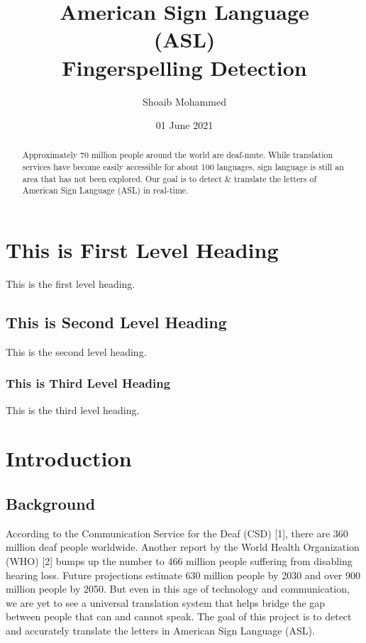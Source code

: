 \documentclass[twocolumn]{article}
\title{American Sign Language\\
	(ASL)\\
	Fingerspelling Detection}
\author{Shoaib Mohammed}
\date{01 June 2021}
\begin{document}
\begin{titlepage}
\maketitle
\thispagestyle{empty}
\end{titlepage}

\begin{abstract}
	Approximately 70 million people around the world are deaf-mute. While 
	translation services have become easily accessible for about 100 
	languages, sign language is still an area that has not been explored. 
	Our goal is to detect \& translate the letters of American Sign Language 
	(ASL) in real-time.
\end{abstract}

\section{This is First Level Heading}
This is the first level heading.

\subsection{This is Second Level Heading}
This is the second level heading.

\subsubsection{This is Third Level Heading}
This is the third level heading.

\section{Introduction}

\subsection{Background}
According to the Communication Service for the Deaf (CSD) [1], there are 360 
million deaf people worldwide. Another report by the World Health 
Organization (WHO) [2] bumps up the number to 466 million people suffering 
from disabling hearing loss. Future projections estimate 630 million people by 
2030 and over 900 million people by 2050. But even in this age of technology 
and communication, we are yet to see a universal translation system that helps 
bridge the gap between people that can and cannot speak. The goal of this 
project is to detect and accurately translate the letters in American Sign 
Language (ASL).
\end{document}
